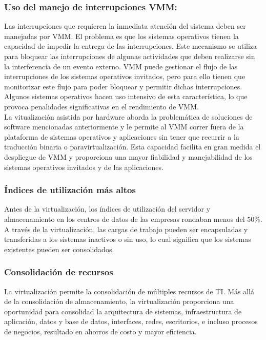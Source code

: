 \documentclass[10pt,a4paper,spanish]{report}
\begin{document}
  \subsubsection{Uso del manejo de interrupciones VMM:}

  \noindent
  Las interrupciones que requieren la inmediata atención del sistema deben ser manejadas por VMM. El problema es que los sistemas operativos tienen la capacidad de impedir la entrega de las interrupciones. Este mecanismo se utiliza para bloquear las interrupciones de algunas actividades que deben realizarse sin la interferencia de un evento externo. VMM puede gestionar el flujo de las interrupciones de los sistemas operativos invitados, pero para ello tienen que monitorizar este flujo para poder bloquear y permitir dichas interrupciones. Algunos sistemas operativos hacen uso intensivo de esta característica, lo que provoca penalidades significativas en el rendimiento de VMM. \\

  \noindent
  La vitualización asistida por hardware aborda la problemática de soluciones de software mencionadas anteriormente y le permite al VMM correr fuera de la plataforma de sistemas operativos y aplicaciones sin tener que recurrir a la traducción binaria o paravirtualización. Esta capacidad facilita en gran medida el despliegue de VMM y proporciona una mayor fiabilidad y manejabilidad de los sistemas operativos invitados y de las aplicaciones.

  \subsubsection{Índices de utilización más altos}
  Antes de la virtualización, los índices de utilización del servidor y almacenamiento en los centros de datos de las empresas rondaban menos del 50\%. A través de la virtualización, las cargas de trabajo pueden ser encapsuladas y transferidas a los sistemas inactivos o sin uso, lo cual significa que los sistemas existentes pueden ser consolidados.

  \subsubsection{Consolidación de recursos}

  \noindent
  La virtualización permite la consolidación de múltiples recursos de TI. Más allá de la consolidación de almacenamiento, la virtualización proporciona una oportunidad para consolidad la arquitectura de sistemas, infraestructura de aplicación, datos y base de datos, interfaces, redes, escritorios, e incluso procesos de negocios, resultado en ahorros de costo y mayor eficiencia.
\end{document}
